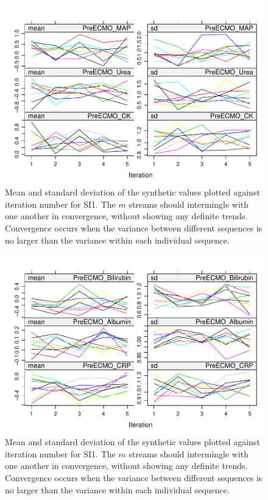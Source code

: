 \documentclass[12pt,]{article}
\begin{document}
\begin{figure}[H]
{\centering \includegraphics[width=0.75\linewidth]{figure/graphics-unnamed-chunk-16-3} 

}

\caption{\label{fig:converge-mean}Mean and standard deviation of the synthetic values plotted against iteration number for SI1.  The $m$ streams should intermingle with one another in convergence, without showing any definite trends.  Convergence occurs when the variance between different sequences is no larger than the variance within each individual sequence.}\label{fig:unnamed-chunk-163}
\end{figure}\begin{figure}[H]

{\centering \includegraphics[width=0.75\linewidth]{figure/graphics-unnamed-chunk-16-4} 

}

\caption{\label{fig:converge-mean}Mean and standard deviation of the synthetic values plotted against iteration number for SI1.  The $m$ streams should intermingle with one another in convergence, without showing any definite trends.  Convergence occurs when the variance between different sequences is no larger than the variance within each individual sequence.}\label{fig:unnamed-chunk-164}
\end{figure}\begin{figure}[H]


\end{figure}
\end{document}

